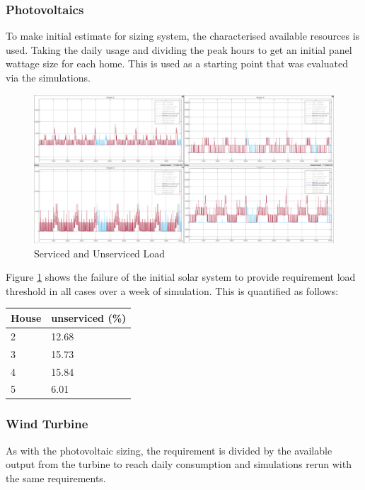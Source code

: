 \documentclass[journal]{IEEEtran}
\begin{document}
                \subsubsection*{Photovoltaics}
                To make initial estimate for sizing system, the  characterised available resources is used. Taking the daily usage and dividing the peak hours to get an initial panel wattage size for each home. This is used as a starting point that was evaluated via the simulations.
                \begin{figure}[h!]
                        \centering
                        \includegraphics[width=0.7\linewidth]{fig/init_solar_load.png}
                        \caption{Serviced and Unserviced Load}
                        \label{fig:solar_init}
                \end{figure} 
                Figure \ref{fig:solar_init} shows the failure of the initial solar system to provide requirement load threshold in all cases over a week of simulation. This is quantified as follows:

                \begin{table}[h!]
                        \centering
                        \begin{tabular}{|l|l|}
                        \hline
                        \textbf{House} & \textbf{unserviced (\%)} \\ \hline
                        2              & 12.68                    \\ \hline
                        3              & 15.73                    \\ \hline
                        4              & 15.84                    \\ \hline
                        5              & 6.01                     \\ \hline
                        \end{tabular}
                        \end{table}

                \subsubsection*{Wind Turbine}
                As with the photovoltaic sizing, the requirement is divided by the available output from the turbine to reach daily consumption and simulations rerun with the same requirements.
\end{document}
